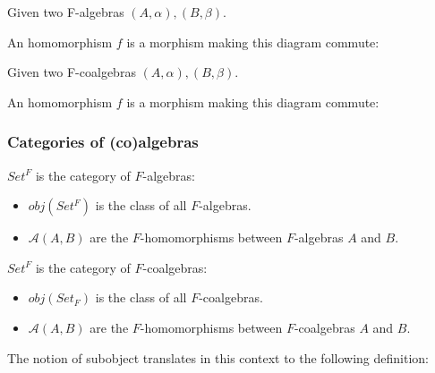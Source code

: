 \begin{definition}
Given two F-algebras $(A,\alpha),(B,\beta)$. 

An homomorphism $f$ is a morphism making this diagram commute:	
	
\end{definition}

\begin{definition}
Given two F-coalgebras $(A,\alpha),(B,\beta)$.

An homomorphism $f$ is a morphism making this diagram commute:	
	
\end{definition}

\subsubsection{Categories of (co)algebras}

\begin{definition}
	$Set^F$ is the category of $F$-algebras:
	
	\begin{itemize}
		\item $obj(Set^F)$ is the class of all $F$-algebras.
		\item $\mathcal{A}(A,B)$ are the $F$-homomorphisms between $F$-algebras $A$ and $B$.
	\end{itemize}

	$Set^F$ is the category of $F$-coalgebras:

	\begin{itemize}
		\item $obj(Set_F)$ is the class of all $F$-coalgebras.
		\item $\mathcal{A}(A,B)$ are the $F$-homomorphisms between $F$-coalgebras $A$ and $B$.
	\end{itemize}
\end{definition}

The notion of subobject translates in this context to the following definition:

